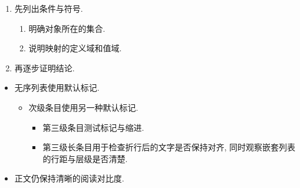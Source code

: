 \documentclass[UTF8,12pt,oneside,fontset=fandol]{ctexbook}
\theoremstyle{mtfang}
\theoremstyle{bookheading}
\theoremstyle{bookheading}
\theoremstyle{bookexample}
\begin{document}
\begin{enumerate}
    \item
        先列出条件与符号.
        \begin{enumerate}
            \item
                明确对象所在的集合.
            \item
                说明映射的定义域和值域.
        \end{enumerate}
    \item
        再逐步证明结论.
\end{enumerate}
\begin{itemize}
    \item
        无序列表使用默认标记.
        \begin{itemize}
            \item
                次级条目使用另一种默认标记.
                \begin{itemize}
                    \item
                        第三级条目测试标记与缩进.
                    \item
                        第三级长条目用于检查折行后的文字是否保持对齐,
                        同时观察嵌套列表的行距与层级是否清楚.
                \end{itemize}
        \end{itemize}
    \item
        正文仍保持清晰的阅读对比度.
\end{itemize}
\end{document}
